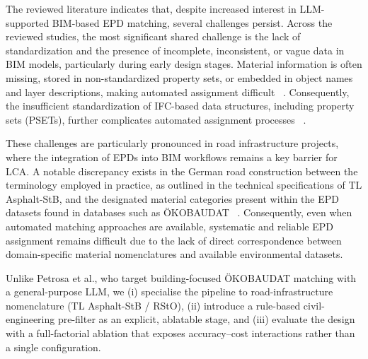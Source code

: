 \documentclass[10pt, a4paper, twocolumn]{article}
\begin{document}
The reviewed literature indicates that, despite increased interest in LLM-supported BIM-based EPD matching, several challenges persist. Across the reviewed studies, the most significant shared challenge is the lack of standardization and the presence of incomplete, inconsistent, or vague data in BIM models, particularly during early design stages. Material information is often missing, stored in non-standardized property sets, or embedded in object names and layer descriptions, making automated assignment difficult ~\cite{Forth.2023,Hermann.2024,J.HofmeyerK.ForthS.EsserA.Borrmann.,Petrosa.2025}. Consequently, the insufficient standardization of IFC-based data structures, including property sets (PSETs), further complicates automated assignment processes ~\cite{Wastiels.2019, PotrcObrecht.2020}.

These challenges are particularly pronounced in road infrastructure projects, where the integration of EPDs into BIM workflows remains a key barrier for LCA. A notable discrepancy exists in the German road construction between the terminology employed in practice, as outlined in the technical specifications of TL Asphalt-StB, and the designated material categories present within the EPD datasets found in databases such as ÖKOBAUDAT ~\cite{Kaus.2025}. Consequently, even when automated matching approaches are available, systematic and reliable EPD assignment remains difficult due to the lack of direct correspondence between domain-specific material nomenclatures and available environmental datasets. 

Unlike Petrosa et al., who target building-focused ÖKOBAUDAT matching with a general-purpose LLM, we (i) specialise the pipeline to road-infrastructure nomenclature (TL Asphalt-StB / RStO), (ii) introduce a rule-based civil-engineering pre-filter as an explicit, ablatable stage, and (iii) evaluate the design with a full-factorial ablation that exposes accuracy–cost interactions rather than a single configuration.
\end{document}
